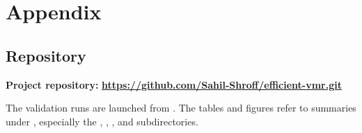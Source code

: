 \section{Appendix}
\label{sec:appendix}

\subsection{Repository}
\label{app:repository}

\noindent\textbf{Project repository:}
\href{https://github.com/Sahil-Shroff/efficient-vmr.git}{\textcolor{RepoLinkBlue}{\textbf{https://github.com/Sahil-Shroff/efficient-vmr.git}}}

The validation runs are launched from . The tables and figures refer to summaries under , especially the , , , and  subdirectories.
